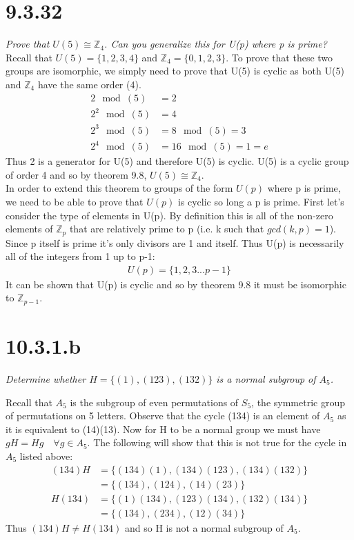 \documentclass[a4paper, 11pt]{article}
\begin{document}
\section*{9.3.32}
\textit{Prove that $U(5)\cong \mathbb{Z}_4$. Can you generalize this for U(p) where p is prime?}\\

\noindent Recall that $U(5) = \{1,2,3,4\}$ and $\mathbb{Z}_4 = \{0,1,2,3\}$. To prove that these two groups are isomorphic, we simply need to prove that U(5) is cyclic as both U(5) and $\mathbb{Z}_4$ have the same order (4).  
	\begin{align*}
		2 \mod(5) &= 2 \\ 
		2^2 \mod(5) &=  4 \\ 
		2^3 \mod(5) &= 8 \mod(5) = 3 \\ 
		2^4 \mod(5) &= 16 \mod(5) = 1 = e 
	\end{align*}
Thus 2 is a generator for U(5) and therefore U(5) is cyclic. U(5) is a cyclic group of order 4 and so by theorem 9.8, $U(5) \cong \mathbb{Z}_4$. \\ 

\noindent In order to extend this theorem to groups of the form $U(p)$ where p is prime, we need to be able to prove that $U(p)$ is cyclic so long a p is prime. First let's consider the type of elements in U(p). By definition this is all of the non-zero elements of $\mathbb{Z}_p$ that are relatively prime to p (i.e. k such that $gcd(k,p)=1$). Since p itself is prime it's only divisors are 1 and itself. Thus U(p) is necessarily all of the integers from 1 up to p-1: 
	\begin{align}
		U(p) = \{1,2,3...p-1\}
	\end{align}
It can be shown that U(p) is cyclic and so by theorem 9.8 it must be isomorphic to $\mathbb{Z}_{p-1}$. 

\section*{10.3.1.b}
\textit{Determine whether $H=\{(1),(123),(132)\}$ is a normal subgroup of $A_5$.}

Recall that $A_5$ is the subgroup of even permutations of $S_5$, the symmetric group of permutations on 5 letters. Observe that the cycle (134) is an element of $A_5$ as it is equivalent to (14)(13). Now for H to be a normal group we must have $gH=Hg \quad \forall g \in A_5$. The following will show that this is not true for the cycle in $A_5$ listed above: 
	\begin{align}
		(134)H &= \{(134)(1), (134)(123), (134)(132)\} \\ 
				&= \{(134), (124), (14)(23)\} \\ 
		H(134) &= \{(1)(134), (123)(134), (132)(134)\} \\ 
				&= \{(134), (234), (12)(34)\}  
	\end{align}
Thus $(134)H \neq H(134)$ and so H is not a normal subgroup of $A_5$. 
\end{document}
